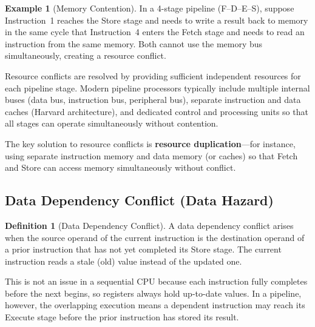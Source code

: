 \documentclass[11pt, a4paper, notitlepage]{report}
\theoremstyle{definition}
\newtheorem{definition}[theorem]{Definition}
\theoremstyle{remark}
\theoremstyle{definition}
\newtheorem{example}[theorem]{Example}
\begin{document}
\begin{example}[Memory Contention]
\label{ex:resource-conflict}
In a 4-stage pipeline (F--D--E--S), suppose Instruction~1 reaches the Store stage and needs to write a result back to memory in the same cycle that Instruction~4 enters the Fetch stage and needs to read an instruction from the same memory. Both cannot use the memory bus simultaneously, creating a resource conflict.
\end{example}

Resource conflicts are resolved by providing sufficient independent resources for each pipeline stage. Modern pipeline processors typically include multiple internal buses (data bus, instruction bus, peripheral bus), separate instruction and data caches (Harvard architecture), and dedicated control and processing units so that all stages can operate simultaneously without contention.

\begin{examtip}[title={Exam Tip: Resolving Resource Conflicts}]
  The key solution to resource conflicts is \textbf{resource duplication}---for instance, using separate instruction memory and data memory (or caches) so that Fetch and Store can access memory simultaneously without conflict.
\end{examtip}

\subsection{Data Dependency Conflict (Data Hazard)}
\label{sec:data-dependency}

\begin{definition}[Data Dependency Conflict]
\label{def:data-dependency}
  A data dependency conflict arises when the source operand of the current instruction is the destination operand of a prior instruction that has not yet completed its Store stage. The current instruction reads a stale (old) value instead of the updated one.
\end{definition}

This is not an issue in a sequential CPU because each instruction fully completes before the next begins, so registers always hold up-to-date values. In a pipeline, however, the overlapping execution means a dependent instruction may reach its Execute stage before the prior instruction has stored its result.
\end{document}
